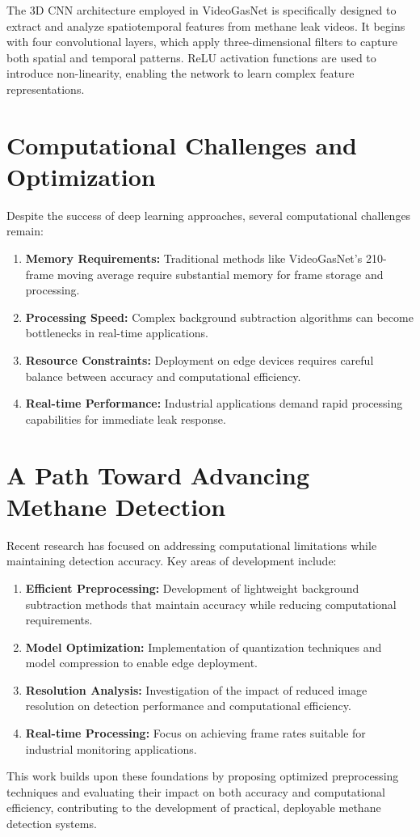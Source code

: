 The 3D CNN architecture employed in VideoGasNet is specifically designed to extract and analyze spatiotemporal features from methane leak videos. It begins with four convolutional layers, which apply three-dimensional filters to capture both spatial and temporal patterns. ReLU activation functions are used to introduce non-linearity, enabling the network to learn complex feature representations.

\section{Computational Challenges and Optimization}

Despite the success of deep learning approaches, several computational challenges remain:

\begin{enumerate}
\item \textbf{Memory Requirements:} Traditional methods like VideoGasNet's 210-frame moving average require substantial memory for frame storage and processing.

\item \textbf{Processing Speed:} Complex background subtraction algorithms can become bottlenecks in real-time applications.

\item \textbf{Resource Constraints:} Deployment on edge devices requires careful balance between accuracy and computational efficiency.

\item \textbf{Real-time Performance:} Industrial applications demand rapid processing capabilities for immediate leak response.
\end{enumerate}

\section{A Path Toward Advancing Methane Detection}

Recent research has focused on addressing computational limitations while maintaining detection accuracy. Key areas of development include:

\begin{enumerate}
\item \textbf{Efficient Preprocessing:} Development of lightweight background subtraction methods that maintain accuracy while reducing computational requirements.

\item \textbf{Model Optimization:} Implementation of quantization techniques and model compression to enable edge deployment.

\item \textbf{Resolution Analysis:} Investigation of the impact of reduced image resolution on detection performance and computational efficiency.

\item \textbf{Real-time Processing:} Focus on achieving frame rates suitable for industrial monitoring applications.
\end{enumerate}

This work builds upon these foundations by proposing optimized preprocessing techniques and evaluating their impact on both accuracy and computational efficiency, contributing to the development of practical, deployable methane detection systems.